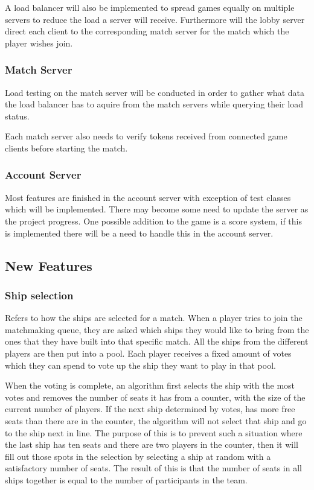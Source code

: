\documentclass[11pt]{report}
\begin{document}
A load balancer will also be implemented to spread games equally on multiple servers to reduce the load a server will receive. Furthermore will the lobby server direct each client to the corresponding match server for the match which the player wishes join. 
\subsubsection{Match Server}

Load testing on the match server will be conducted in order to gather what data the load balancer has to aquire from the match servers while querying their load status.

Each match server also needs to verify tokens received from connected game clients before starting the match.
\subsubsection{Account Server}

Most features are finished in the account server with exception of test classes which will be implemented. There may become some need to update the server as the project progress. One possible addition to the game is a score system, if this is implemented there will be a need to handle this in the account server.
\subsection{New Features}
\subsubsection{Ship selection} 

Refers to how the ships are selected for a match. When a player tries to join the matchmaking queue, they are asked which ships they would like to bring from the ones that they have built into that specific match. All the ships from the different players are then put into a pool. Each player receives a fixed amount of votes which they can spend to vote up the ship they want to play in that pool. 

When the voting is complete, an algorithm first selects the ship with the most votes and removes the number of seats it has from a counter, with the size of the current number of players. If the next ship determined by votes, has more free seats than there are in the counter, the algorithm will not select that ship and go to the ship next in line. The purpose of this is to prevent such a situation where the last ship has ten seats and there are two players in the counter, then it will fill out those spots in the selection by selecting a ship at random with a satisfactory number of seats. The result of this is that the number of seats in all ships together is equal to the number of participants in the team.
\end{document}
